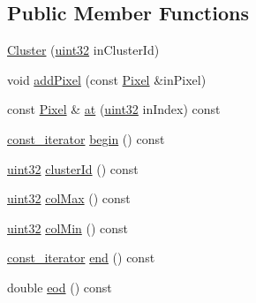 \subsection*{Public Member Functions}
\begin{DoxyCompactItemize}
\item 
\mbox{\hyperlink{class_num_cpp_1_1_image_processing_1_1_cluster_ae630559631a6ae53ee59529a3a42b782}{Cluster}} (\mbox{\hyperlink{namespace_num_cpp_a36f388e948380413c63011cab9b7fbd5}{uint32}} in\+Cluster\+Id)
\item 
void \mbox{\hyperlink{class_num_cpp_1_1_image_processing_1_1_cluster_ab8df067c115882959ee28a0c3d8b5bd1}{add\+Pixel}} (const \mbox{\hyperlink{class_num_cpp_1_1_image_processing_1_1_pixel}{Pixel}} \&in\+Pixel)
\item 
const \mbox{\hyperlink{class_num_cpp_1_1_image_processing_1_1_pixel}{Pixel}} \& \mbox{\hyperlink{class_num_cpp_1_1_image_processing_1_1_cluster_acb1723012708c5d01715bcbaa9ae9659}{at}} (\mbox{\hyperlink{namespace_num_cpp_a36f388e948380413c63011cab9b7fbd5}{uint32}} in\+Index) const
\item 
\mbox{\hyperlink{class_num_cpp_1_1_image_processing_1_1_cluster_a8f26defce53112d60fd1a178b5669ce6}{const\+\_\+iterator}} \mbox{\hyperlink{class_num_cpp_1_1_image_processing_1_1_cluster_a202b31339744938c1acec76b64169eef}{begin}} () const
\item 
\mbox{\hyperlink{namespace_num_cpp_a36f388e948380413c63011cab9b7fbd5}{uint32}} \mbox{\hyperlink{class_num_cpp_1_1_image_processing_1_1_cluster_a947f832c565ce3a89d53579cb2817cda}{cluster\+Id}} () const
\item 
\mbox{\hyperlink{namespace_num_cpp_a36f388e948380413c63011cab9b7fbd5}{uint32}} \mbox{\hyperlink{class_num_cpp_1_1_image_processing_1_1_cluster_a6bb57ad3da4b9ee976fe452294acad72}{col\+Max}} () const
\item 
\mbox{\hyperlink{namespace_num_cpp_a36f388e948380413c63011cab9b7fbd5}{uint32}} \mbox{\hyperlink{class_num_cpp_1_1_image_processing_1_1_cluster_ad48f873ecbec96c34292d141864cfc31}{col\+Min}} () const
\item 
\mbox{\hyperlink{class_num_cpp_1_1_image_processing_1_1_cluster_a8f26defce53112d60fd1a178b5669ce6}{const\+\_\+iterator}} \mbox{\hyperlink{class_num_cpp_1_1_image_processing_1_1_cluster_af796051228091567f23e5c86e87680af}{end}} () const
\item 
double \mbox{\hyperlink{class_num_cpp_1_1_image_processing_1_1_cluster_a94b1532f666e9413fe34406763ef8173}{eod}} () const
\item 

\end{DoxyCompactItemize}
